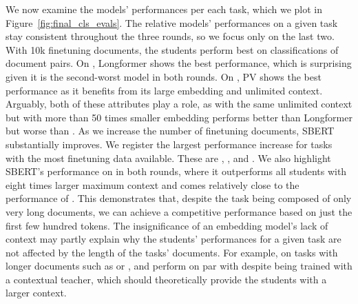 We now examine the models' performances per each task, which we plot in
Figure~\ref{fig:final_cls_evals}. The relative models' performances on a given
task stay consistent throughout the three rounds, so we focus only on the last
two. With 10k finetuning documents, the students perform best on
classifications of document pairs. On , Longformer shows the best
performance, which is surprising given it is the second-worst model in both
rounds. On , PV shows the best performance as it benefits from its
large embedding and unlimited context. Arguably, both of these attributes play
a role, as  with the same unlimited context but with more than 50
times smaller embedding performs better than Longformer but worse than
. As we increase the number of finetuning documents, SBERT
substantially improves. We register the largest performance increase for tasks
with the most finetuning data available. These are , , and
. We also highlight SBERT's performance on  in both
rounds, where it outperforms all students with eight times larger maximum
context and comes relatively close to the performance of . This
demonstrates that, despite the task being composed of only very long documents,
we can achieve a competitive performance based on just the first few hundred
tokens. The insignificance of an embedding model's lack of context may partly
explain why the students' performances for a given task are not affected by the
length of the tasks' documents. For example, on tasks with longer documents
such as  or , {\CosineStudent} and {\MSEStudent} perform
on par with {\OnlyMSEStudent} despite being trained with a contextual teacher,
which should theoretically provide the students with a larger context.

